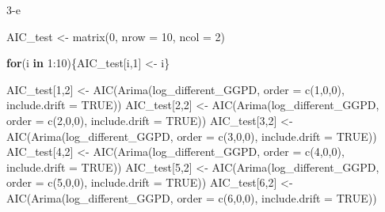 \documentclass[
]{article}
\newenvironment{Shaded}{\begin{snugshade}}{\end{snugshade}}
\newcommand{\AttributeTok}[1]{\textcolor[rgb]{0.77,0.63,0.00}{#1}}
\newcommand{\ConstantTok}[1]{\textcolor[rgb]{0.00,0.00,0.00}{#1}}
\newcommand{\ControlFlowTok}[1]{\textcolor[rgb]{0.13,0.29,0.53}{\textbf{#1}}}
\newcommand{\DecValTok}[1]{\textcolor[rgb]{0.00,0.00,0.81}{#1}}
\newcommand{\FunctionTok}[1]{\textcolor[rgb]{0.00,0.00,0.00}{#1}}
\newcommand{\NormalTok}[1]{#1}
\newcommand{\OtherTok}[1]{\textcolor[rgb]{0.56,0.35,0.01}{#1}}
\newcommand{\SpecialCharTok}[1]{\textcolor[rgb]{0.00,0.00,0.00}{#1}}
\begin{document}
3-e

\begin{Shaded}
\begin{Highlighting}[]
\NormalTok{AIC\_test }\OtherTok{\textless{}{-}} \FunctionTok{matrix}\NormalTok{(}\DecValTok{0}\NormalTok{, }\AttributeTok{nrow =} \DecValTok{10}\NormalTok{, }\AttributeTok{ncol =} \DecValTok{2}\NormalTok{)}

\ControlFlowTok{for}\NormalTok{(i }\ControlFlowTok{in} \DecValTok{1}\SpecialCharTok{:}\DecValTok{10}\NormalTok{)\{AIC\_test[i,}\DecValTok{1}\NormalTok{] }\OtherTok{\textless{}{-}}\NormalTok{ i\}}

\NormalTok{AIC\_test[}\DecValTok{1}\NormalTok{,}\DecValTok{2}\NormalTok{] }\OtherTok{\textless{}{-}} \FunctionTok{AIC}\NormalTok{(}\FunctionTok{Arima}\NormalTok{(log\_different\_GGPD, }\AttributeTok{order =} \FunctionTok{c}\NormalTok{(}\DecValTok{1}\NormalTok{,}\DecValTok{0}\NormalTok{,}\DecValTok{0}\NormalTok{), }\AttributeTok{include.drift =} \ConstantTok{TRUE}\NormalTok{))}
\NormalTok{AIC\_test[}\DecValTok{2}\NormalTok{,}\DecValTok{2}\NormalTok{] }\OtherTok{\textless{}{-}} \FunctionTok{AIC}\NormalTok{(}\FunctionTok{Arima}\NormalTok{(log\_different\_GGPD, }\AttributeTok{order =} \FunctionTok{c}\NormalTok{(}\DecValTok{2}\NormalTok{,}\DecValTok{0}\NormalTok{,}\DecValTok{0}\NormalTok{), }\AttributeTok{include.drift =} \ConstantTok{TRUE}\NormalTok{))}
\NormalTok{AIC\_test[}\DecValTok{3}\NormalTok{,}\DecValTok{2}\NormalTok{] }\OtherTok{\textless{}{-}} \FunctionTok{AIC}\NormalTok{(}\FunctionTok{Arima}\NormalTok{(log\_different\_GGPD, }\AttributeTok{order =} \FunctionTok{c}\NormalTok{(}\DecValTok{3}\NormalTok{,}\DecValTok{0}\NormalTok{,}\DecValTok{0}\NormalTok{), }\AttributeTok{include.drift =} \ConstantTok{TRUE}\NormalTok{))}
\NormalTok{AIC\_test[}\DecValTok{4}\NormalTok{,}\DecValTok{2}\NormalTok{] }\OtherTok{\textless{}{-}} \FunctionTok{AIC}\NormalTok{(}\FunctionTok{Arima}\NormalTok{(log\_different\_GGPD, }\AttributeTok{order =} \FunctionTok{c}\NormalTok{(}\DecValTok{4}\NormalTok{,}\DecValTok{0}\NormalTok{,}\DecValTok{0}\NormalTok{), }\AttributeTok{include.drift =} \ConstantTok{TRUE}\NormalTok{))}
\NormalTok{AIC\_test[}\DecValTok{5}\NormalTok{,}\DecValTok{2}\NormalTok{] }\OtherTok{\textless{}{-}} \FunctionTok{AIC}\NormalTok{(}\FunctionTok{Arima}\NormalTok{(log\_different\_GGPD, }\AttributeTok{order =} \FunctionTok{c}\NormalTok{(}\DecValTok{5}\NormalTok{,}\DecValTok{0}\NormalTok{,}\DecValTok{0}\NormalTok{), }\AttributeTok{include.drift =} \ConstantTok{TRUE}\NormalTok{))}
\NormalTok{AIC\_test[}\DecValTok{6}\NormalTok{,}\DecValTok{2}\NormalTok{] }\OtherTok{\textless{}{-}} \FunctionTok{AIC}\NormalTok{(}\FunctionTok{Arima}\NormalTok{(log\_different\_GGPD, }\AttributeTok{order =} \FunctionTok{c}\NormalTok{(}\DecValTok{6}\NormalTok{,}\DecValTok{0}\NormalTok{,}\DecValTok{0}\NormalTok{), }\AttributeTok{include.drift =} \ConstantTok{TRUE}\NormalTok{))}

\end{Highlighting}
\end{Shaded}
\end{document}
